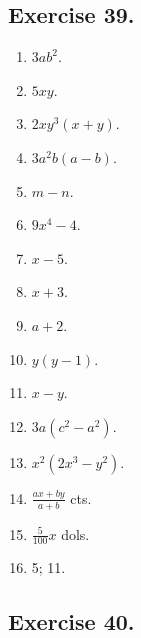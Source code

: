 \documentclass{book}
\begin{document}
\subsection*{Exercise 39.}


\begin{enumerate}

\item $3ab^2$.

\item $5xy$.

\item $2xy^3\left(x+y\right)$.

\item $3a^2b\left(a-b\right)$.

\item $m-n$.

\item $9x^4-4$.

\item $x-5$.

\item $x+3$.

\item $a+2$.

\item $y\left(y-1\right)$.

\item $x-y$.

\item $3a\left(c^2-a^2\right)$.

\item $x^2\left(2x^3-y^2\right)$.

\item $\displaystyle \frac{ax+by}{a+b}$ cts.

\item $\displaystyle \frac{5}{100}x$ dols.

\item 5; 11.

\end{enumerate}


\subsection*{Exercise 40.}
\end{document}
